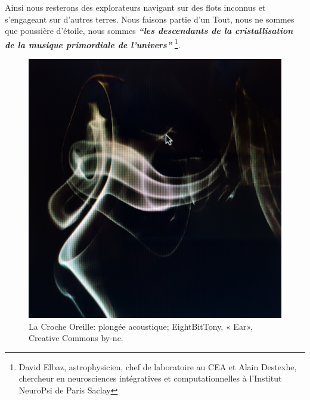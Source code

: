 

Ainsi nous resterons des explorateurs navigant sur des flots inconnus et
s'engageant sur d'autres terres.
Nous faisons partie d'un Tout, nous ne sommes que poussière d'étoile,
nous sommes
\textit{\textbf{``les descendants de la  cristallisation de la musique primordiale de
l'univers''}} \autocite{delbaz_recherche_2016}\footnote{David Elbaz, astrophysicien, chef de laboratoire 
au CEA et Alain
Destexhe, chercheur en neurosciences intégratives et computationnelles
à l'Institut  NeuroPsi de Paris Saclay}.




      \begin{figure}[tbh]
        \centering
        \includegraphics[width=1\linewidth]{images/oreillephoto.jpg}
        \caption{La Croche Oreille: plongée acoustique; EightBitTony, « Ear», Creative Commons by-nc.}
        \label{fig}
      \end{figure}


